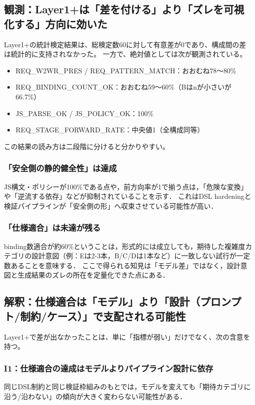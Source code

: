 \documentclass[senior,final,11pt,dvipdfmx]{iputit-thesis}
\begin{document}
\subsection{観測：Layer1+は「差を付ける」より「ズレを可視化する」方向に効いた}
\label{subsec:disc_layer1plus_obs}

Layer1+の統計検定結果は、総検定数60に対して有意差が0であり、構成間の差は統計的に支持されなかった。
一方で、絶対値としては次が観測されている。
\begin{itemize}
\item REQ\_W2WR\_PRES / REQ\_PATTERN\_MATCH：おおむね78〜80\%
\item REQ\_BINDING\_COUNT\_OK：おおむね59〜60\%（Bはnが小さいが66.7\%）
\item JS\_PARSE\_OK / JS\_POLICY\_OK：100\%
\item REQ\_STAGE\_FORWARD\_RATE：中央値1（全構成同等）
\end{itemize}

この結果の読み方は二段階に分けると分かりやすい。
\subsubsection{「安全側の静的健全性」は達成}
JS構文・ポリシーが100\%である点や，前方向率が1で揃う点は，「危険な変換」や「逆流する依存」などが抑制されていることを示す．
これはDSL hardeningと検証パイプラインが「安全側の形」へ収束させている可能性が高い．

\subsubsection{「仕様適合」は未達が残る}
binding数適合が約60\%ということは，形式的には成立しても，期待した複雑度カテゴリの設計意図（例：Eは2-3本，B/C/Dは1本など）に一致しない試行が一定数あることを意味する．
ここで得られる知見は「モデル差」ではなく，設計意図と生成結果のズレの所在を定量化できた点にある．

\subsection{解釈：仕様適合は「モデル」より「設計（プロンプト/制約/ケース）」で支配される可能性}
\label{subsec:disc_layer1plus_interp}

Layer1+で差が出なかったことは、単に「指標が弱い」だけでなく、次の含意を持つ。
\subsubsection{I1：仕様適合の達成はモデルよりパイプライン設計に依存}
同じDSL制約と同じ検証枠組みのもとでは，モデルを変えても「期待カテゴリに沿う/沿わない」の傾向が大きく変わらない可能性がある．
\end{document}
